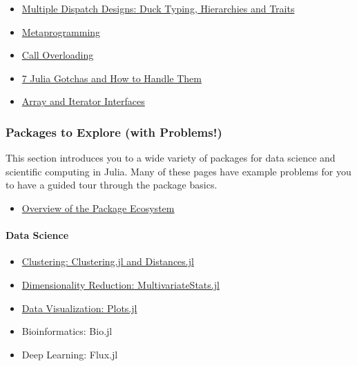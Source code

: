\documentclass[11pt]{article}
\begin{document}
\begin{itemize}
\itemsep1pt\parskip0pt
\item
  \href{http://ucidatascienceinitiative.github.io/IntroToJulia/Html/DispatchDesigns}{Multiple
  Dispatch Designs: Duck Typing, Hierarchies and Traits}
\item
  \href{http://ucidatascienceinitiative.github.io/IntroToJulia/Html/Metaprogramming}{Metaprogramming}
\item
  \href{http://ucidatascienceinitiative.github.io/IntroToJulia/Html/CallOverloading}{Call
  Overloading}
\item
  \href{http://www.stochasticlifestyle.com/7-julia-gotchas-handle/}{7
  Julia Gotchas and How to Handle Them}
\item
  \href{http://ucidatascienceinitiative.github.io/IntroToJulia/Html/ArrayIteratorInterfaces}{Array
  and Iterator Interfaces}
\end{itemize}

\subsubsection{Packages to Explore (with
Problems!)}\label{packages-to-explore-with-problems}

This section introduces you to a wide variety of packages for data
science and scientific computing in Julia. Many of these pages have
example problems for you to have a guided tour through the package
basics.

\begin{itemize}
\itemsep1pt\parskip0pt
\item
  \href{http://ucidatascienceinitiative.github.io/IntroToJulia/Html/PackageEcosystem}{Overview
  of the Package Ecosystem}
\end{itemize}

\paragraph{Data Science}\label{data-science}

\begin{itemize}
\itemsep1pt\parskip0pt
\item
  \href{http://ucidatascienceinitiative.github.io/IntroToJulia/Html/Clustering}{Clustering:
  Clustering.jl and Distances.jl}
\item
  \href{http://ucidatascienceinitiative.github.io/IntroToJulia/Html/DimensionalityReduction}{Dimensionality
  Reduction: MultivariateStats.jl}
\item
  \href{http://ucidatascienceinitiative.github.io/IntroToJulia/Html/PlotsJL}{Data
  Visualization: Plots.jl}
\item
  Bioinformatics: Bio.jl
\item
  Deep Learning: Flux.jl
\end{itemize}
\end{document}
